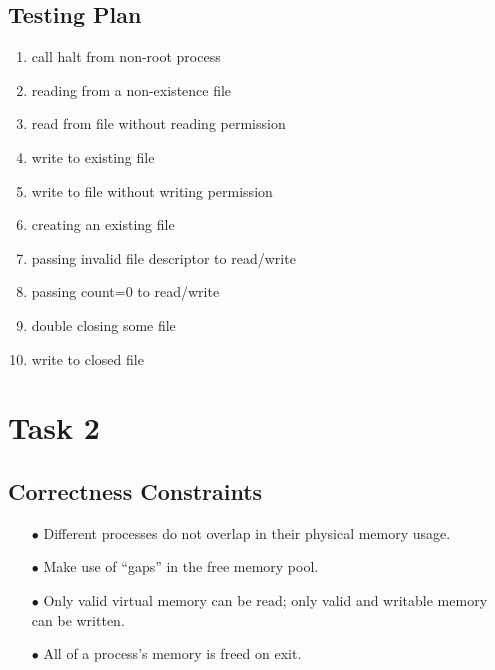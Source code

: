 \documentclass{article}
\begin{document}
\begin{spacing}{1.1}
\subsection{Testing Plan}
\begin{enumerate}
\item call \textsf{halt} from non-root process
\item reading from a non-existence file
\item read from file without reading permission
\item write to existing file
\item write to file without writing permission
\item creating an existing file
\item passing invalid file descriptor to read/write
\item passing \textsf{count=0} to read/write
\item double closing some file
\item write to closed file
\end{enumerate}

\section{Task 2}

\subsection{Correctness Constraints}
\begin{enumerate}
  \item[$\bullet$] Different processes do not overlap in their physical memory usage.
  \item[$\bullet$] Make use of ``gaps'' in the free memory pool.
  \item[$\bullet$] Only valid virtual memory can be read; only valid and writable
    memory can be written.
  \item[$\bullet$] All of a process's memory is freed on exit.
\end{enumerate}


\end{spacing}
\end{document}
